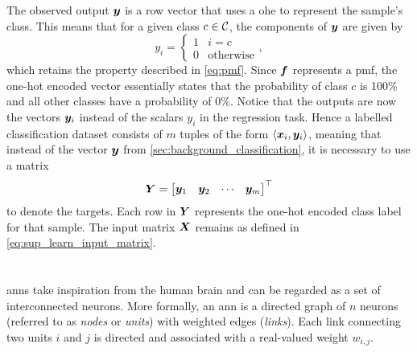 \documentclass[../report.tex]{subfiles}
\begin{document}
The observed output ${\bm{y}}$ is a row vector that uses a \gls{ohe} to represent the sample's class. 
This means that for a given class $c \in {\mathcal{C}}$, the components of ${\bm{y}}$ are given by
\begin{equation*}
    y_i = \begin{cases}
        1 & i=c \\
        0 & \text{otherwise}
    \end{cases},
\end{equation*}
which retains the property described in \cref{eq:pmf}.
Since ${\bm{f}}$ represents a \gls{pmf}, the one-hot encoded vector essentially states that the probability of class $c$ is 100\% and all other classes have a probability of 0\%.
Notice that the outputs are now the vectors ${\bm{y}}_i$ instead of the scalars $y_i$ in the regression task.
Hence a labelled classification dataset consists of $m$ tuples of the form $\langle {\bm{x}}_i,{\bm{y}}_i \rangle$, meaning that instead of the vector ${\bm{y}}$ from \cref{sec:background_classification}, it is necessary to use a matrix
\begin{equation}
    {\bm{Y}} = \begin{bmatrix}
        {\bm{y}}_1 & {\bm{y}}_2 & \cdots & {\bm{y}}_m
    \end{bmatrix}^\top
\end{equation}
to denote the targets.
Each row in ${\bm{Y}}$ represents the one-hot encoded class label for that sample. 
The input matrix ${\bm{X}}$ remains as defined in \cref{eq:sup_learn_input_matrix}.

\section{}
\label{sec:ann}
\Glspl{ann} take inspiration from the human brain and can be regarded as a set of interconnected neurons. 
More formally, an \gls{ann} is a directed graph of $n$ neurons (referred to as \emph{nodes} or \emph{units}) with weighted edges (\emph{links}).
Each link connecting two units $i$ and $j$ is directed and associated with a real-valued weight $w_{i,j}$. 
\end{document}
